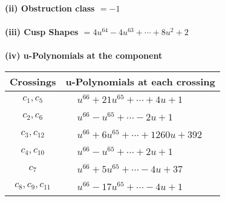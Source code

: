 \documentclass[1p]{elsarticle_modified}
\theoremstyle{definition}
\begin{document}
\flushleft \textbf{(ii) Obstruction class $= -1$}\\~\\
\flushleft \textbf{(iii) Cusp Shapes $= 4 u^{64}-4 u^{63}+\cdots+8 u^2+2$}\\~\\
\newpage\renewcommand{\arraystretch}{1}
\flushleft \textbf{(iv) u-Polynomials at the component}\newline \\
\begin{tabular}{m{50pt}|m{274pt}}
Crossings & \hspace{64pt}u-Polynomials at each crossing \\
\hline $$\begin{aligned}c_{1},c_{5}\end{aligned}$$&$\begin{aligned}
&u^{66}+21 u^{65}+\cdots+4 u+1
\end{aligned}$\\
\hline $$\begin{aligned}c_{2},c_{6}\end{aligned}$$&$\begin{aligned}
&u^{66}- u^{65}+\cdots-2 u+1
\end{aligned}$\\
\hline $$\begin{aligned}c_{3},c_{12}\end{aligned}$$&$\begin{aligned}
&u^{66}+6 u^{65}+\cdots+1260 u+392
\end{aligned}$\\
\hline $$\begin{aligned}c_{4},c_{10}\end{aligned}$$&$\begin{aligned}
&u^{66}- u^{65}+\cdots+2 u+1
\end{aligned}$\\
\hline $$\begin{aligned}c_{7}\end{aligned}$$&$\begin{aligned}
&u^{66}+5 u^{65}+\cdots-4 u+37
\end{aligned}$\\
\hline $$\begin{aligned}c_{8},c_{9},c_{11}\end{aligned}$$&$\begin{aligned}
&u^{66}-17 u^{65}+\cdots-4 u+1
\end{aligned}$\\
\hline
\end{tabular}\\~\\
\end{document}
